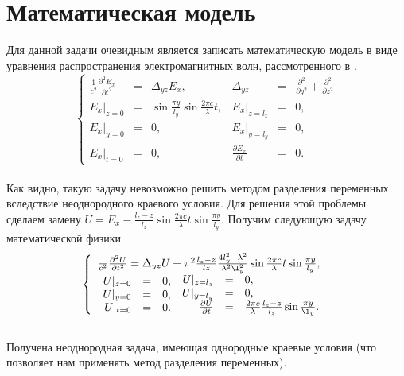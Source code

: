 \chapter{Математическая модель}

Для данной задачи очевидным является записать математическую модель в
виде уравнения распространения электромагнитных волн, рассмотренного в \cite{samarsky}.
\[
\left\{
\begin{array}{rclrcl}
  \frac{1}{c^2} \frac{\partial^2 E_x}{\partial t^2} &=& \Delta_{yz}
  E_x, & \Delta_{yz} &=& \frac{\partial^2}{\partial y^2} + \frac{\partial^2}{\partial z^2}\\
  E_x|_{z=0} &=& \sin\frac{\pi y}{l_y} \sin\frac{2\pi c}{\lambda}t, & E_x|_{z=l_z} &=& 0,\\
  E_x|_{y=0} &=& 0, & E_x|_{y=l_y} &=& 0,\\
  E_x|_{t=0} &=& 0, & \frac{\partial E_x}{\partial t} &=& 0.
\end{array}
\right.
\]
\\
Как видно, такую задачу невозможно решить методом разделения
переменных вследствие неоднородного краевого условия. Для решения этой
проблемы сделаем замену $U = E_x - \frac{l_z - z}{l_z} \sin\frac{2\pi
  c}{\lambda}t \sin\frac{\pi y}{l_y}$. Получим следующую задачу
математической физики
\[
\left\{
  \begin{array}{l}
    \frac{1}{c^2} \frac{\partial^2 U}{\partial t^2} = \Delta_{yz} U + \pi^2
    \frac{l_z - z}{lz}\frac{4l_y^2 - \lambda^2}{\lambda^2
      \l_y^2}\sin\frac{2\pi c}{\lambda}t \sin\frac{\pi y}{l_y},\\
    \begin{array}{rcl}
      U|_{z=0} &=& 0,\\
      U|_{y=0} &=& 0,\\
      U|_{t=0} &=& 0.\\
    \end{array}
    \begin{array}{rcl}
      U|_{z=l_z} &=& 0,\\
      U|_{y=l_y} &=& 0,\\
      \frac{\partial U}{\partial t} &=& \frac{2\pi
        c}{\lambda} \frac{l_z - z}{l_z} \sin\frac{\pi y}{\l_y}.
    \end{array}
  \end{array}
\right.
\]
\\
Получена неоднородная задача, имеющая однородные краевые условия (что
позволяет нам применять метод разделения переменных).
